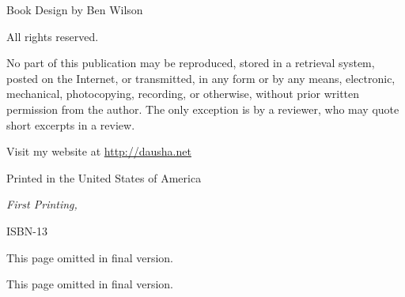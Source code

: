   \par\noindent Book Design by Ben Wilson\newline

  \par\noindent All rights reserved.\newline

  \par\noindent No part of this publication may be reproduced, stored in a retrieval system, posted on the Internet, or transmitted, in any form or by any means, electronic, mechanical, photocopying, recording, or otherwise, without prior written permission from the author. The only exception is by a reviewer, who may quote short excerpts in a review.\newline

  \par\noindent \theauthor
  \par\noindent Visit my website at \url{http://dausha.net}\newline

  \par\noindent Printed in the United States of America
  \newline

  \par\noindent\textit{First Printing, \usmonthyear{}}
  \newline
  
  \par\noindent ISBN-13 \isbn
  \vspace*{\fill}
  \newpage

%
\ifdefined\isfinal
\else
  
  
  This page omitted in final version.
  
  \listoftodos
  \newpage
  This page omitted in final version.
  \tableofcontents
  \newpage
\fi
